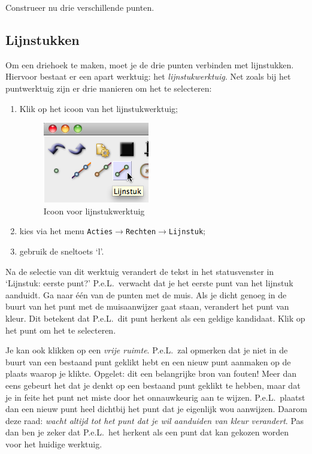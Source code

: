 Construeer nu drie verschillende punten.

\subsection{Lijnstukken}
Om een driehoek te maken, moet je de drie punten verbinden met lijnstukken. Hiervoor bestaat er een apart werktuig: het \emph{lijnstukwerktuig}. Net zoals bij het puntwerktuig zijn er drie manieren om het te selecteren:
\begin{enumerate}
\item Klik op het icoon van het lijnstukwerktuig;
\begin{figure}[htb]
    \centering
    \includegraphics[]{figuren/PeL/Lijnstukicoon.png}
       \caption{Icoon voor lijnstukwerktuig}
    \label{fig:lijnstukicoon}
\end{figure}
\item kies via het menu \texttt{Acties$\rightarrow$Rechten$\rightarrow$Lijnstuk};
\item gebruik de sneltoets `l'. 
\end{enumerate}

Na de selectie van dit werktuig verandert de tekst in het statusvenster in `Lijnstuk: eerste punt?' P.e.L.\ verwacht dat je het eerste punt van het lijnstuk aanduidt. Ga naar \'{e}\'{e}n van de punten met de muis. Als je dicht genoeg in de buurt van het punt met de muisaanwijzer gaat staan, verandert het punt van kleur. Dit betekent dat P.e.L.\ dit punt herkent als een geldige kandidaat. Klik op het punt om het te selecteren. 

Je kan ook klikken op een \emph{vrije ruimte}. P.e.L.\ zal opmerken dat je niet in de buurt van een bestaand punt geklikt hebt en een nieuw punt aanmaken op de plaats waarop je klikte. Opgelet: dit een belangrijke bron van fouten! Meer dan eens gebeurt het dat je denkt op een bestaand punt geklikt te hebben, maar dat je in feite het punt net miste door het onnauwkeurig aan te wijzen.  P.e.L.\ plaatst dan een nieuw punt heel dichtbij het punt dat je eigenlijk wou aanwijzen. Daarom deze raad: \emph{wacht altijd tot het punt dat je wil aanduiden van kleur verandert}. Pas dan ben je zeker dat P.e.L.\ het herkent als een punt dat kan gekozen worden voor het huidige werktuig.

